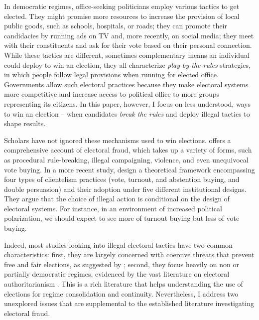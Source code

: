 \documentclass[11pt]{article}
\begin{document}
In democratic regimes, office-seeking politicians employ various tactics to get elected. They might promise more resources to increase the provision of local public goods, such as schools, hospitals, or roads; they can promote their candidacies by running ads on TV and, more recently, on social media; they meet with their constituents and ask for their vote based on their personal connection. While these tactics are different, sometimes complementary means an individual could deploy to win an election, they all characterize \emph{play-by-the-rules} strategies, in which people follow legal provisions when running for elected office. Governments allow such electoral practices because they make electoral systems more competitive and increase access to political office to more groups representing its citizens. In this paper, however, I focus on less understood, ways to win an election -- when candidates \emph{break the rules} and deploy illegal tactics to shape results.

Scholars have not ignored these mechanisms used to win elections. \citet{LehoucqElectoralFraudCauses2003} offers a comprehensive account of electoral fraud, which takes up a variety of forms, such as procedural rule-breaking, illegal campaigning, violence, and even unequivocal vote buying. In a more recent study, \citet{Gans-MorseVarietiesClientelismMachine2013a} design a theoretical framework encompassing four types of clientelism practices (vote, turnout, and abstention buying, and double persuasion) and their adoption under five different institutional designs. They argue that the choice of illegal action is conditional on the design of electoral systems. For instance, in an environment of increased political polarization, we should expect to see more of turnout buying but less of vote buying.

Indeed, most studies looking into illegal electoral tactics have two common characteristics: first, they are largely concerned with coercive threats that prevent free and fair elections, as suggested by \citet{MaresBuyingExpropriatingStealing2016}; second, they focus heavily on non or partially democratic regimes, evidenced by the vast literature on electoral authoritarianism \citep{LevitskyRiseCompetitiveAuthoritarianism2002,GandhiElectionsAuthoritarianism2009,IchinoDeterringDisplacingElectoral2012,SchedlerElectoralAuthoritarianism2015,AsunkaElectoralFraudViolence2017a}. This is a rich literature that helps understanding the use of elections for regime consolidation and continuity. Nevertheless, I address two unexplored issues that are supplemental to the established literature investigating electoral fraud.
\end{document}
